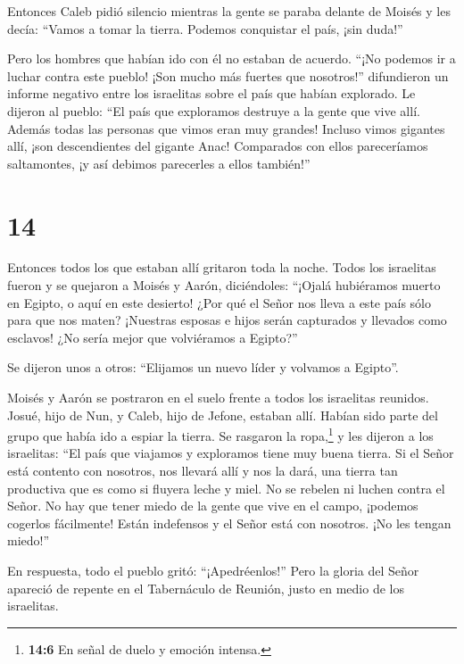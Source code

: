  Entonces Caleb pidió silencio mientras la gente se paraba
delante de Moisés y les decía: ``Vamos a tomar la tierra. Podemos
conquistar el país, ¡sin duda!''

 Pero los hombres que habían ido con él no estaban de
acuerdo. ``¡No podemos ir a luchar contra este pueblo! ¡Son mucho más
fuertes que nosotros!''  difundieron un informe negativo
entre los israelitas sobre el país que habían explorado. Le dijeron al
pueblo: ``El país que exploramos destruye a la gente que vive allí.
Además todas las personas que vimos eran muy grandes! 
Incluso vimos gigantes allí, ¡son descendientes del gigante Anac!
Comparados con ellos pareceríamos saltamontes, ¡y así debimos parecerles
a ellos también!''

\hypertarget{section-13}{%
\section{14}\label{section-13}}

 Entonces todos los que estaban allí gritaron toda la noche.
 Todos los israelitas fueron y se quejaron a Moisés y Aarón,
diciéndoles: ``¡Ojalá hubiéramos muerto en Egipto, o aquí en este
desierto!  ¿Por qué el Señor nos lleva a este país sólo para
que nos maten? ¡Nuestras esposas e hijos serán capturados y llevados
como esclavos! ¿No sería mejor que volviéramos a Egipto?''

 Se dijeron unos a otros: ``Elijamos un nuevo líder y
volvamos a Egipto''.

 Moisés y Aarón se postraron en el suelo frente a todos los
israelitas reunidos.  Josué, hijo de Nun, y Caleb, hijo de
Jefone, estaban allí. Habían sido parte del grupo que había ido a espiar
la tierra. Se rasgaron la ropa,\footnote{\textbf{14:6} En señal de duelo
  y emoción intensa.}  y les dijeron a los israelitas: ``El
país que viajamos y exploramos tiene muy buena tierra.  Si
el Señor está contento con nosotros, nos llevará allí y nos la dará, una
tierra tan productiva que es como si fluyera leche y miel. 
No se rebelen ni luchen contra el Señor. No hay que tener miedo de la
gente que vive en el campo, ¡podemos cogerlos fácilmente! Están
indefensos y el Señor está con nosotros. ¡No les tengan miedo!''

 En respuesta, todo el pueblo gritó: ``¡Apedréenlos!'' Pero
la gloria del Señor apareció de repente en el Tabernáculo de Reunión,
justo en medio de los israelitas.

